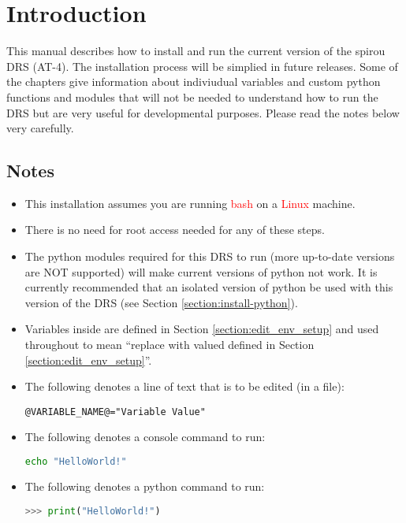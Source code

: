 \chapter{Introduction}

This manual describes how to install and run the current version of the spirou DRS (AT-4). The installation process will be simplied in future releases. Some of the chapters give information about indiviudual variables and custom python functions and modules that will not be needed to understand how to run the DRS but are very useful for developmental purposes. Please read the notes below very carefully.

\section{Notes}
\begin{itemize}
\item This installation assumes you are running \textcolor{red}{bash} on a \textcolor{red}{Linux} machine.

\item There is no need for root access needed for any of these steps.

\item The python modules required for this DRS to run (more up-to-date versions are NOT supported) will make current versions of python not work. It is currently recommended that an isolated version of python be used with this version of the DRS (see Section \ref{section:install-python}).

\item Variables inside  are defined in Section \ref{section:edit_env_setup} and used throughout to mean ``replace with valued defined in Section \ref{section:edit_env_setup}''.

\item The following denotes a line of text that is to be edited (in a file):

\begin{lstlisting}[style=text]
@VARIABLE_NAME@="Variable Value"
\end{lstlisting}

\item The following denotes a console command to run:

\begin{lstlisting}[language=bash, style=bashstyle]
echo "HelloWorld!"
\end{lstlisting}


\item The following denotes a python command to run:


\begin{lstlisting}[language=Python, style=pythonstyle]
>>> print("HelloWorld!")
\end{lstlisting}

\end{itemize}